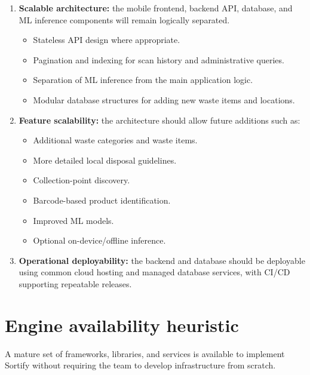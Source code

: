 \documentclass[11pt,a4paper]{article}
\begin{document}
\begin{enumerate}[leftmargin=0.7cm]
    \item \textbf{Scalable architecture:} the mobile frontend, backend API, database, and ML inference components will remain logically separated.
    \begin{itemize}[leftmargin=0.7cm]
        \item Stateless API design where appropriate.
        \item Pagination and indexing for scan history and administrative queries.
        \item Separation of ML inference from the main application logic.
        \item Modular database structures for adding new waste items and locations.
    \end{itemize}

    \item \textbf{Feature scalability:} the architecture should allow future additions such as:
    \begin{itemize}[leftmargin=0.7cm]
        \item Additional waste categories and waste items.
        \item More detailed local disposal guidelines.
        \item Collection-point discovery.
        \item Barcode-based product identification.
        \item Improved ML models.
        \item Optional on-device/offline inference.
    \end{itemize}

    \item \textbf{Operational deployability:} the backend and database should be deployable using common cloud hosting and managed database services, with CI/CD supporting repeatable releases.
\end{enumerate}

\section{Engine availability heuristic}

A mature set of frameworks, libraries, and services is available to implement Sortify without requiring the team to develop infrastructure from scratch.
\end{document}
